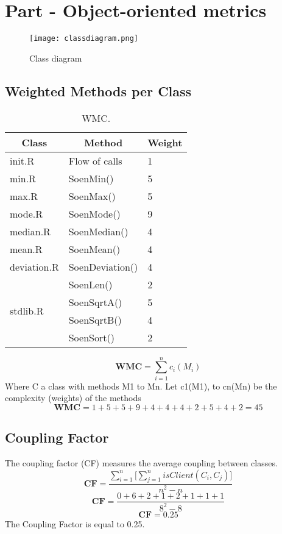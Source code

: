 \documentclass[12pt]{article}
\begin{document}
\section{Part - Object-oriented metrics}
\begin{figure}[h]
\centering
\texttt{[image: classdiagram.png]}
\caption{Class diagram}
\end{figure}
\subsection{Weighted Methods per Class}

\begin{table}[h]
\centering
\begin{tabular}{|l|l|l|}
\hline
\multicolumn{1}{|c|}{\textbf{Class}} & \multicolumn{1}{c|}{\textbf{Method}} & \multicolumn{1}{c|}{\textbf{Weight}} \\ \hline
init.R & Flow of calls & 1 \\ \hline
min.R & SoenMin() & 5 \\ \hline
max.R & SoenMax() & 5 \\ \hline
mode.R & SoenMode() & 9 \\ \hline
median.R & SoenMedian() & 4 \\ \hline
mean.R & SoenMean() & 4 \\ \hline
deviation.R & SoenDeviation() & 4 \\ \hline
\multirow{4}{*}{stdlib.R} & SoenLen() & 2 \\ \cline{2-3} 
 & SoenSqrtA() & 5 \\ \cline{2-3} 
 & SoenSqrtB() & 4 \\ \cline{2-3} 
 & SoenSort() & 2 \\ \hline
\end{tabular}
\caption{WMC.}
\end{table}
\begin{equation}
    \textbf{WMC} =\sum^{n}_{i=1}{c_{i}(M_{i})}  
\end{equation}
Where C a class with methods M1 to Mn. Let c1(M1), to cn(Mn) be the complexity (weights) of the methods \cite{OOD}
\begin{equation}
    \textbf{WMC} = 1+5+5+9+4+4+4+2+5+4+2 = 45  
\end{equation}
\subsection{Coupling Factor}

The coupling factor (CF) measures the average coupling between classes. 
\begin{equation}
    \textbf{CF} =\frac{\sum^{n}_{i=1}{\Bigg[\sum^{n}_{j=1}{isClient(C_{i},C_{j})\Bigg]}}}{n^2-n}  
\end{equation}
\begin{equation}
    \textbf{CF} =\frac{0+6+2+1+2+1+1+1}{8^2-8}  
\end{equation}
\begin{equation}
    \textbf{CF} = 0.25
\end{equation}
The Coupling Factor is equal to 0.25.
\end{document}
